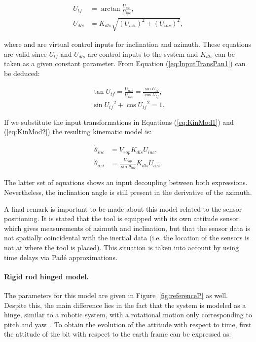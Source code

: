 \begin{align}
	U_{tf} &=  \arctan{\frac{U_{azi}}{U_{inc}}}\label{eq:InputTransPan1}, \\
	U_{dls} &= K_{dls}\sqrt{(U_{azi})^2 + (U_{inc})^2}\label{eq:InputTransPan2},
\end{align}

where  and  are virtual control inputs for inclination and azimuth. These equations are valid since $U_{tf}$ and $U_{dls}$ are control inputs to the system and $K_{dls}$ can be taken as a given constant parameter. From Equation (\ref{eq:InputTransPan1}) can be deduced:

\begin{align*}
	\tan{U_{tf}} =  \frac{U_{azi}}{U_{inc}} = \frac{\sin{U_{tf}}}{\cos{U_{tf}}}, \\
	\sin{U_{tf}}^2 + \cos{U_{tf}}^2 = 1.
\end{align*}

If we substitute the input transformations in Equations (\ref{eq:KinMod1}) and (\ref{eq:KinMod2}) the resulting kinematic model is:

\begin{align}
	\dot{\theta}_{inc} & =  V_{rop} K_{dls} U_{inc}\label{eq:nonlinearPanchal1}, \\
	\dot{\theta}_{azi} & =  \frac{V_{rop}}{\sin{\theta_{inc}}} K_{dls} U_{azi}\label{eq:nonlinearPanchal2}.
\end{align}

The latter set of equations shows an input decoupling between both expressions. Nevertheless, the inclination angle is still present in the derivative of the azimuth.

A final remark is important to be made about this model related to the sensor positioning. It is stated that the tool is equipped with its own attitude sensor which gives measurements of azimuth and inclination, but that the sensor data is not spatially coincidental with the inertial data (i.e. the location of the sensors is not at where the tool is placed). This situation is taken into account by using time delays via Padé approximations.

\paragraph{Rigid rod hinged model.}
The parameters for this model are given in Figure~\ref{fig:referenceP} as well. Despite this, the main difference lies in the fact that the system is modeled as a hinge, similar to a robotic system, with a rotational motion only corresponding to pitch and yaw~\cite{Panchal2012}.  To obtain the evolution of the attitude with respect to time, first the attitude of the bit with respect to the earth frame can be expressed as:

